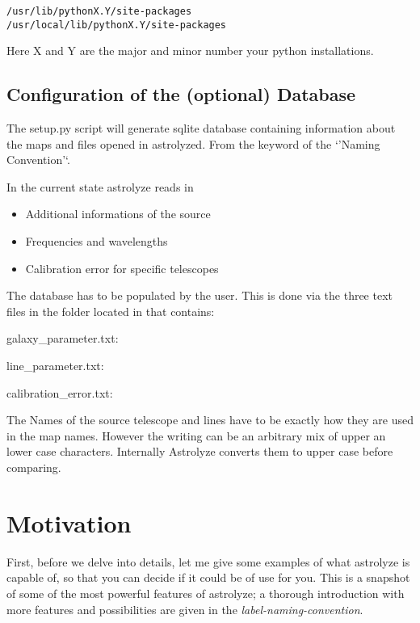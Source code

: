 \documentclass[letterpaper,10pt,english]{sphinxhowto}
\begin{document}
\begin{Verbatim}[commandchars=\\\{\}]
/usr/lib/pythonX.Y/site-packages
/usr/local/lib/pythonX.Y/site-packages
\end{Verbatim}

Here X and Y are the major and minor number your python installations.


\subsection{Configuration of the (optional) Database}
\label{installation:configuration-of-the-optional-database}
The setup.py script will generate  sqlite database containing
information about the maps and files opened in astrolyzed. From the keyword of
the `'Naming Convention'`.

In the current state  astrolyze reads in
\begin{itemize}
\item {} 
Additional informations of the source

\item {} 
Frequencies and wavelengths

\item {} 
Calibration error for specific telescopes

\end{itemize}

The database has to be populated by the user. This is done via the three text
files in the  folder located in  that contains:

galaxy\_parameter.txt:

line\_parameter.txt:

calibration\_error.txt:

The Names of the source telescope and lines have to be exactly how they are
used in the map names. However the writing can be an arbitrary mix of upper an
lower case characters. Internally Astrolyze converts them to upper case before
comparing.


\section{Motivation}
\label{manual:motivation}\label{manual::doc}
First, before we delve into details, let me give some examples of what
astrolyze is capable of, so that you can decide if it could be of use for you.
This is a snapshot of some of the most powerful features of astrolyze; a
thorough introduction with more features and possibilities are given in the
\emph{label-naming-convention}.
\end{document}
